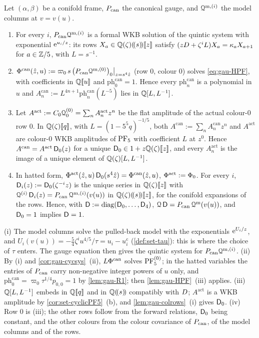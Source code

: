 \begin{thm}
\label{thm:gau-R0}
Let $(\alpha,\beta)$ be a conifold frame, $P_{\mathrm{can}}$ the canonical gauge, and $\mathcal{Q}^{\mathrm m,(i)}$ the model columns at $v=v(u)$.
\begin{enumerate}
\item For every $i$, $P_{\mathrm{can}}\mathcal{Q}^{\mathrm m,(i)}$ is a formal WKB solution of the quintic system with exponential $\mathrm{e}^{u_i/z}$: its rows $X_a\in\mathbb{Q}(\zeta)(\!(s)\!)[\![ z ]\!]$ satisfy $(zD+\zeta^iL)X_a=\kappa_aX_{a+1}$ for $a\in\mathbb{Z}/5$, with $L=s^{-1}$.
\item $\Phi^{\mathrm{can}}(\hat{z},u):=\varpi_0\,s\,\bigl(P_{\mathrm{can}}\mathcal{Q}^{\mathrm m,(0)}\bigr)_0\big|_{z=s^4\hat{z}}$ (row $0$, colour $0$) solves \eqref{eq:gau-HPF}, with coefficients in $\mathbb{Q}[\![ u ]\!]$ and $\mathrm{ph}^{\mathrm{can}}_0=1$. Hence every $\mathrm{ph}^{\mathrm{can}}_n$ is a polynomial in $u$ and $A^{\mathrm{can}}_n:=L^{4n+1}\mathrm{ph}^{\mathrm{can}}_n(L^{-5})$ lies in $\mathbb{Q}[L,L^{-1}]$.
\item Let $A^{\mathrm{act}}:=C_0\mathcal{Q}^{(0)}_0=\sum_nA^{\mathrm{act}}_nz^n$ be the flat amplitude of the actual colour-$0$ row $0$. In $\mathbb{Q}(\zeta)[\![ q ]\!]$, with $L=(1-5^5q)^{-1/5}$, both $A^{\mathrm{can}}:=\sum_nA^{\mathrm{can}}_nz^n$ and $A^{\mathrm{act}}$ are colour-$0$ WKB amplitudes of $\mathrm{PF}_{5}$ with coefficient $L$ at $z^0$. Hence $A^{\mathrm{can}}=A^{\mathrm{act}}\,\mathsf{D}_0(z)$ for a unique $\mathsf{D}_0\in1+z\mathbb{Q}(\zeta)[\![ z ]\!]$, and every $A^{\mathrm{act}}_n$ is the image of a unique element of $\mathbb{Q}(\zeta)[L,L^{-1}]$.
\item In hatted form, $\Phi^{\mathrm{act}}(\hat{z},u)\,\mathsf{D}_0(s^4\hat{z})=\Phi^{\mathrm{can}}(\hat{z},u)$, $\Phi^{\mathrm{act}}:=\Phi_0$. For every $i$, $\mathsf{D}_i(z):=\mathsf{D}_0(\zeta^{-i}z)$ is the unique series in $\mathbb{Q}(\zeta)[\![ z ]\!]$ with $\mathcal{Q}^{(i)}\,\mathsf{D}_i(z)=P_{\mathrm{can}}\,\mathcal{Q}^{\mathrm m,(i)}(v(u))$ in $\mathbb{Q}(\zeta)(\!(s)\!)[\![ z ]\!]$, for the conifold expansions of the rows. Hence, with $\mathsf{D}:=\operatorname{diag}(\mathsf{D}_0,\dots,\mathsf{D}_4)$, $\mathcal{Q}\,\mathsf{D}=P_{\mathrm{can}}\,\mathcal{Q}^{\mathrm m}(v(u))$, and $\mathsf{D}_0=1$ implies $\mathsf{D}=1$.
\end{enumerate}
\end{thm}

\begin{sketch}
(i) The model columns solve the pulled-back model with the exponentials $\mathrm{e}^{U_i/z}$, and $U_i(v(u))=-\frac54\zeta^iu^{4/5}/\tau=u_i-u_i^{\mathrm c}$ (\cref{def:set-tau}): this is where the choice of $\tau$ enters. The gauge equation then gives the quintic system for $P_{\mathrm{can}}\mathcal{Q}^{\mathrm m,(i)}$. (ii) By (i) and \cref{cor:gau-cycsys}~(ii), $L\Phi^{\mathrm{can}}$ solves $\mathrm{PF}_{5}^{(0)}$; in the hatted variables the entries of $P_{\mathrm{can}}$ carry non-negative integer powers of $u$ only, and $\mathrm{ph}^{\mathrm{can}}_0=\varpi_0\tau^{1/4}p_{0,0}=1$ by \cref{lem:gau-R1}; then \cref{lem:gau-HPF}~(iii) applies. (iii) $\mathbb{Q}[L,L^{-1}]$ embeds in $\mathbb{Q}[\![ q ]\!]$ and in $\mathbb{Q}(\!(s)\!)$ compatibly with $D$; $A^{\mathrm{act}}$ is a WKB amplitude by \cref{cor:set-cyclicPF5}~(b), and \cref{lem:gau-colrows}~(i) gives $\mathsf{D}_0$. (iv) Row $0$ is (iii); the other rows follow from the forward relations, $\mathsf{D}_0$ being constant, and the other colours from the colour covariance of $P_{\mathrm{can}}$, of the model columns and of the rows.
\end{sketch}

